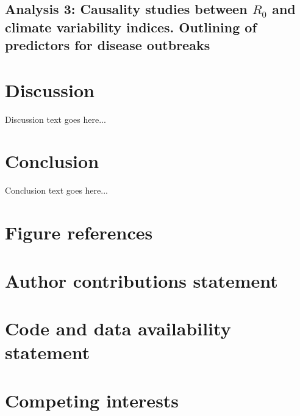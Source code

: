 \documentclass[fleqn,10pt]{wlscirep}
\begin{document}
  \subsection{Analysis 3: Causality studies between $R_0$ and climate variability indices. Outlining of predictors for disease outbreaks} \label{sec-results-3}

  \section{Discussion}

  Discussion text goes here...

  \section{Conclusion}

  Conclusion text goes here...



\section*{Figure references}

\section*{Author contributions statement}

\section*{Code and data availability statement}
\section*{Competing interests}
\end{document}
